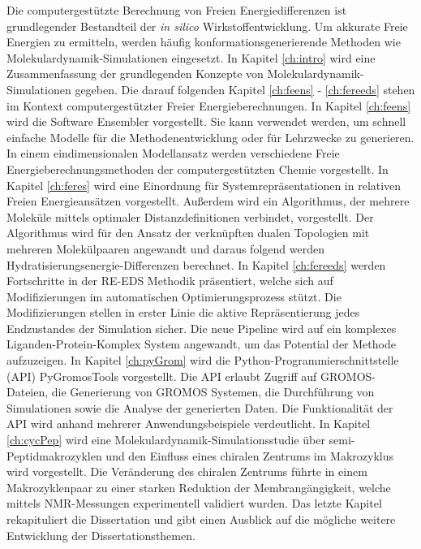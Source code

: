 Die computergestützte Berechnung von Freien Energiedifferenzen ist grundlegender Bestandteil  der \textit{in silico} Wirkstoffentwicklung. Um akkurate Freie Energien zu ermitteln, werden häufig konformationsgenerierende Methoden wie Molekulardynamik-Simulationen eingesetzt. In Kapitel \ref{ch:intro} wird eine Zusammenfassung der grundlegenden Konzepte von Molekulardynamik-Simulationen gegeben. 
Die darauf folgenden Kapitel \ref{ch:feens} - \ref{ch:fereeds} stehen im Kontext computergestützter Freier Energieberechnungen. 
In Kapitel \ref{ch:feens} wird die Software Ensembler vorgestellt. Sie kann verwendet werden, um schnell einfache Modelle für die Methodenentwicklung oder für Lehrzwecke zu generieren. In einem eindimensionalen Modellansatz werden verschiedene Freie Energieberechnungsmethoden der computergestützten Chemie vorgestellt. 
In Kapitel \ref{ch:feres} wird eine Einordnung für Systemrepräsentationen  in relativen Freien Energieansätzen vorgestellt. Außerdem wird ein Algorithmus, der mehrere Moleküle mittels optimaler Distanzdefinitionen verbindet, vorgestellt.  Der Algorithmus wird für den Ansatz der verknüpften dualen Topologien mit mehreren Molekülpaaren angewandt und daraus folgend werden Hydratisierungsenergie-Differenzen berechnet.
In Kapitel \ref{ch:fereeds} werden Fortschritte in der RE-EDS Methodik präsentiert, welche sich auf Modifizierungen im automatischen Optimierungsprozess stützt. Die Modifizierungen stellen in erster Linie die aktive Repräsentierung jedes Endzustandes der Simulation sicher. Die neue Pipeline wird auf ein komplexes Liganden-Protein-Komplex System angewandt, um das Potential der Methode aufzuzeigen.
In Kapitel \ref{ch:pyGrom} wird die Python-Programmierschnittstelle (API) PyGromosTools vorgestellt. Die API erlaubt Zugriff auf GROMOS-Dateien, die Generierung von GROMOS Systemen, die Durchführung von Simulationen sowie die Analyse der generierten Daten. Die Funktionalität der API wird anhand mehrerer Anwendungsbeispiele verdeutlicht.
In Kapitel \ref{ch:cycPep} wird eine Molekulardynamik-Simulationsstudie über semi-Peptidmakrozyklen  und den Einfluss eines chiralen Zentrums im Makrozyklus wird vorgestellt. Die Veränderung des chiralen Zentrums führte in einem Makrozyklenpaar zu einer starken  Reduktion der Membrangängigkeit, welche mittels NMR-Messungen experimentell validiert wurden.
Das letzte Kapitel rekapituliert die Dissertation und gibt einen Ausblick auf die mögliche weitere Entwicklung der Dissertationsthemen.


